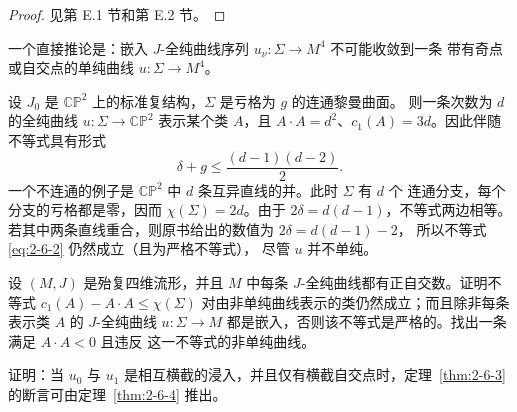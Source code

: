 \begin{proof}
见第 E.1 节和第 E.2 节。
\end{proof}

一个直接推论是：嵌入 $J$-全纯曲线序列 $u_\nu:\Sigma\to M^4$ 不可能收敛到一条
带有奇点或自交点的单纯曲线 $u:\Sigma\to M^4$。

\begin{example}\label{ex:2-6-5}
设 $J_0$ 是 $\mathbb{CP}^2$ 上的标准复结构，$\Sigma$ 是亏格为 $g$ 的连通黎曼曲面。
则一条次数为 $d$ 的全纯曲线 $u:\Sigma\to\mathbb{CP}^2$ 表示某个类 $A$，且
$A\cdot A=d^2$、$c_1(A)=3d$。因此伴随不等式具有形式
\[
  \delta+g\le\frac{(d-1)(d-2)}2.
\]
一个不连通的例子是 $\mathbb{CP}^2$ 中 $d$ 条互异直线的并。此时 $\Sigma$ 有 $d$ 个
连通分支，每个分支的亏格都是零，因而 $\chi(\Sigma)=2d$。由于
$2\delta=d(d-1)$，不等式两边相等。若其中两条直线重合，则原书给出的数值为
$2\delta=d(d-1)-2$，
所以不等式
\eqref{eq:2-6-2}
仍然成立（且为严格不等式），
尽管 $u$ 并不单纯。
\end{example}

\begin{exercise}\label{ex:2-6-6}
设 $(M,J)$ 是殆复四维流形，并且 $M$ 中每条 $J$-全纯曲线都有正自交数。证明不等式
$c_1(A)-A\cdot A\le\chi(\Sigma)$ 对由非单纯曲线表示的类仍然成立；而且除非每条
表示类 $A$ 的 $J$-全纯曲线
$u:\Sigma\to M$ 都是嵌入，否则该不等式是严格的。找出一条满足 $A\cdot A<0$ 且违反
这一不等式的非单纯曲线。
\end{exercise}

\begin{exercise}\label{ex:2-6-7}
证明：当 $u_0$ 与 $u_1$ 是相互横截的浸入，并且仅有横截自交点时，定理~\ref{thm:2-6-3}
的断言可由定理~\ref{thm:2-6-4} 推出。
\end{exercise}


